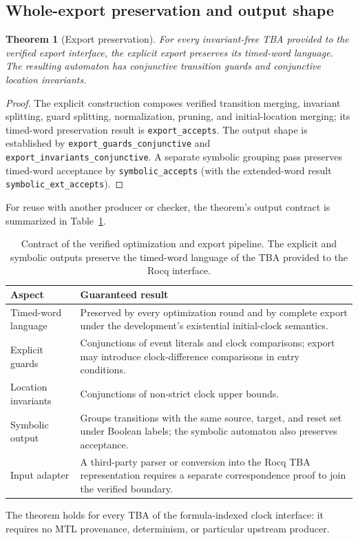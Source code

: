 \documentclass{ieeeaccess}
\newtheorem{theorem}{Theorem}[section]
\begin{document}
\subsection{Whole-export preservation and output shape}
\begin{theorem}[Export preservation]
\label{thm:export}
For every invariant-free TBA provided to the verified export interface, the explicit export preserves its timed-word language. The resulting automaton has conjunctive transition guards and conjunctive location invariants.
\end{theorem}
\begin{proof}
The explicit construction composes verified transition merging, invariant splitting, guard splitting, normalization, pruning, and initial-location merging; its timed-word preservation result is \texttt{export\_accepts}. The output shape is established by \texttt{export\_guards\_conjunctive} and \texttt{export\_invariants\_conjunctive}. A separate symbolic grouping pass preserves timed-word acceptance by \texttt{symbolic\_accepts} (with the extended-word result \texttt{symbolic\_ext\_accepts}).
\end{proof}
For reuse with another producer or checker, the theorem's output contract is
summarized in Table~\ref{tab:export-contract}.
\begin{table}[t]
\centering
\caption{Contract of the verified optimization and export pipeline. The
explicit and symbolic outputs preserve the timed-word language of the TBA
provided to the Rocq interface.}
\label{tab:export-contract}
\small
\begin{tabular}{@{}p{}p{}@{}}
\toprule
Aspect & Guaranteed result\\
\midrule
Timed-word language & Preserved by every optimization round and by complete export under the development's existential initial-clock semantics.\\
Explicit guards & Conjunctions of event literals and clock comparisons; export may introduce clock-difference comparisons in entry conditions.\\
Location invariants & Conjunctions of non-strict clock upper bounds.\\
Symbolic output & Groups transitions with the same source, target, and reset set under Boolean labels; the symbolic automaton also preserves acceptance.\\
Input adapter & A third-party parser or conversion into the Rocq TBA representation requires a separate correspondence proof to join the verified boundary.\\
\bottomrule
\end{tabular}
\end{table}
The theorem holds for every TBA of the formula-indexed clock interface: it requires no MTL provenance,
determinism, or particular upstream producer.
\end{document}
